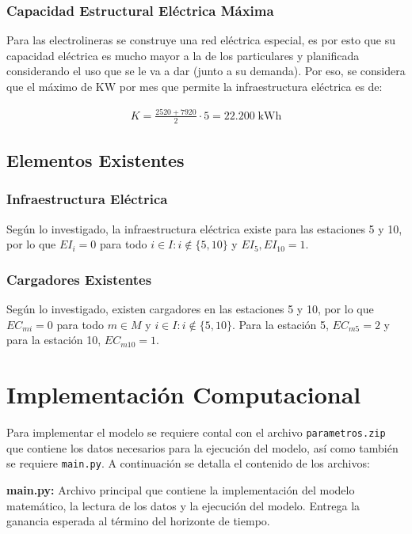 \documentclass[letterpaper]{article}
\begin{document}
\begin{flushleft}
	\subsubsection{Capacidad Estructural Eléctrica Máxima}

	Para las electrolineras se construye una red eléctrica especial, es por esto que su capacidad eléctrica es mucho mayor a la de los particulares y planificada considerando el uso que se le va a dar (junto a su demanda). Por eso, se considera que el máximo de KW por mes que permite la infraestructura eléctrica es de:

	\begin{align*}
		K = \frac{2520 + 7920}{2} \cdot 5= 22.200 \; \text{kWh}
	\end{align*}

	\subsection{Elementos Existentes}

	\subsubsection{Infraestructura Eléctrica}

	Según lo investigado, la infraestructura eléctrica existe para las estaciones 5 y 10, por lo que $EI_i = 0$ para todo $i \in I: i \not \in \{5,10\}$ y $EI_5,EI_{10}=1$.

	\subsubsection{Cargadores Existentes}

	Según lo investigado, existen cargadores en las estaciones 5 y 10, por lo que $EC_{mi} = 0$ para todo $m \in M$ y $i \in I: i \not \in \{5,10\}$. Para la estación 5, $EC_{m5} = 2$ y para la estación 10, $EC_{m10} = 1$.

	\section{Implementación Computacional}

	Para implementar el modelo se requiere contal con el archivo \texttt{parametros.zip} que contiene los datos necesarios para la ejecución del modelo, así como también se requiere \texttt{main.py}. A continuación se detalla el contenido de los archivos:

	\textbf{main.py:} Archivo principal que contiene la implementación del modelo matemático, la lectura de los datos y la ejecución del modelo. Entrega la ganancia esperada al término del horizonte de tiempo.


\end{flushleft}
\end{document}
